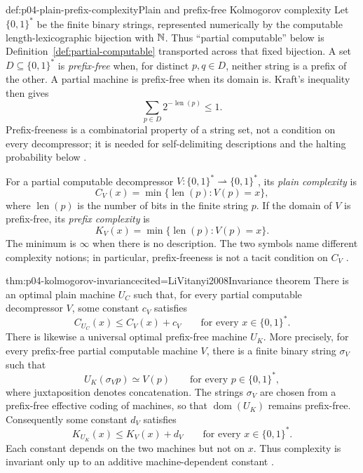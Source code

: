 \begin{hbdefinition}{def:p04-plain-prefix-complexity}{Plain and prefix-free Kolmogorov complexity}
Let \(\{0,1\}^*\) be the finite binary strings, represented numerically by
the computable length-lexicographic bijection with \(\mathbb{N}\).  Thus ``partial
computable'' below is Definition~\ref{def:partial-computable} transported
across that fixed bijection.  A set \(D\subseteq\{0,1\}^*\) is
\emph{prefix-free} when, for distinct \(p,q\in D\), neither string is a prefix
of the other.  A partial machine is prefix-free when its domain is.  Kraft's
inequality then gives
\[
 \sum_{p\in D}2^{-\operatorname{len}(p)}\leq1.
\]
Prefix-freeness is a combinatorial property of a string set, not a condition on
every decompressor; it is needed for self-delimiting descriptions and the
halting probability below \cite{LiVitanyi2008}.

For a partial computable
decompressor \(V:\{0,1\}^*\rightharpoonup\{0,1\}^*\), its \emph{plain
complexity} is
\[
 C_V(x)=\min\{\operatorname{len}(p):V(p)=x\},
\]
where \(\operatorname{len}(p)\) is the number of bits in the finite string
\(p\).
If the domain of \(V\) is prefix-free, its \emph{prefix complexity} is
\[
 K_V(x)=\min\{\operatorname{len}(p):V(p)=x\}.
\]
The minimum is \(\infty\) when there is no description.  The two symbols name
different complexity notions; in particular, prefix-freeness is not a tacit
condition on \(C_V\) \cite{Kolmogorov1965,LiVitanyi2008}.
\end{hbdefinition}

\begin{hbtheorem}{thm:p04-kolmogorov-invariance}{cited=LiVitanyi2008}{Invariance theorem}
There is an optimal plain machine \(U_C\) such that, for every partial
computable decompressor \(V\), some constant \(c_V\) satisfies
\[
 C_{U_C}(x)\leq C_V(x)+c_V
 \qquad\text{for every }x\in\{0,1\}^*.
\]
There is likewise a universal optimal prefix-free machine \(U_K\).  More
precisely, for every prefix-free partial computable machine \(V\), there is a
finite binary string \(\sigma_V\) such that
\[
 U_K(\sigma_Vp)\simeq V(p)\qquad\text{for every }p\in\{0,1\}^*,
\]
where juxtaposition denotes concatenation.  The strings \(\sigma_V\) are
chosen from a prefix-free effective coding of machines, so that
\(\operatorname{dom}(U_K)\) remains prefix-free.  Consequently
some constant \(d_V\) satisfies
\[
 K_{U_K}(x)\leq K_V(x)+d_V
 \qquad\text{for every }x\in\{0,1\}^*.
\]
Each constant depends on the two machines but not on \(x\).  Thus complexity
is invariant only up to an additive machine-dependent constant
\cite{Kolmogorov1965}.
\end{hbtheorem}

